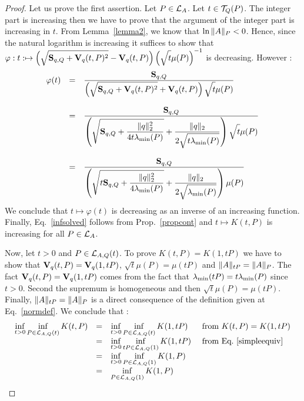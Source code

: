\documentclass[10pt]{article}
\begin{document}
\begin{proof}
Let us prove the first assertion.
Let $P\in\mathcal{L}_{A}$. Let $t\in\mathcal{T}_{Q}(P)$. The integer part is increasing then we have to prove that the argument of the integer part is increasing in $t$. From Lemma~\ref{lemma2}, we know that $\ln{\| A\|_P}<0$. Hence, since the natural logarithm is increasing it suffices to show that $\varphi:t:\mapsto \left(\sqrt{\strut \mathbf{S}_{q,Q}+\mathbf{V}_{q}(t,P)^2}-\mathbf{V}_{q}(t,P)\right)\left(\sqrt{\strut t}\mu(P)\right)^{-1}$ is decreasing. However :
\[
\begin{array}{lll}
\varphi(t)&=&\dfrac{\mathbf{S}_{q,Q}}{\left(\sqrt{\strut \mathbf{S}_{q,Q}+\mathbf{V}_{q}(t,P)^2}+\mathbf{V}_{q}(t,P)\right)\sqrt{\strut t}\mu(P)}\\
\\
&=&\dfrac{\mathbf{S}_{q,Q}}{\left(\sqrt{\strut \mathbf{S}_{q,Q}+\dfrac{\| q\|_2^2 }{4t\lambda_{\operatorname{min}}(P)}}+\dfrac{\| q\|_2 }{2\sqrt{\strut t\lambda_{\operatorname{min}}(P)}}\right)\sqrt{\strut t}\mu(P)}\\
\\
&=&\dfrac{\mathbf{S}_{q,Q}}{\left(\sqrt{\strut t\mathbf{S}_{q,Q}+\dfrac{\| q\|_2^2 }{4\lambda_{\operatorname{min}}(P)}}+\dfrac{\| q\|_2 }{2\sqrt{\strut \lambda_{\operatorname{min}}(P)}}\right)\mu(P)}
\end{array}
\]
We conclude that $t\mapsto \varphi(t)$ is decreasing as an inverse of an increasing function. 
Finally, Eq.~\eqref{infsolved} follows from Prop.~\ref{propcont} and $t\mapsto K(t,P)$ is increasing for all $P\in\mathcal{L}_{A}$.  

Now, let $t>0$ and $P\in\mathcal{L}_{A,Q}(t)$. To prove $K(t,P)=K(1,tP)$ we have to show that $\mathbf{V}_{q}(t,P)=\mathbf{V}_{q}(1,tP)$, $\sqrt{t}\mu(P)=\mu(tP)$
and $\| A\|_{tP}=\| A\|_P$. The fact $\mathbf{V}_{q}(t,P)=\mathbf{V}_{q}(1,tP)$ comes from the fact that $\lambda_{\operatorname{min}}(tP)=t\lambda_{\operatorname{min}}(P)$ since $t>0$. Second the supremum is homogeneous and then $\sqrt{t}\mu(P)=\mu(tP)$. Finally, $\| A\|_{tP}=\| A\|_P$ is a direct consequence of the definition given at Eq.~\eqref{normdef}. We conclude that :
\[
\begin{array}{llll}
\displaystyle{\inf_{t>0} \inf_{P\in\mathcal{L}_{A,Q}(t)} K(t,P)}&=&\displaystyle{\inf_{t>0} \inf_{P\in\mathcal{L}_{A,Q}(t)} K(1,tP)}& \text{ from } K(t,P)=K(1,tP)\\
&=&\displaystyle{\inf_{t>0} \inf_{tP\in\mathcal{L}_{A,Q}(1)} K(1,tP)}&\text{ from Eq.~\eqref{simpleequiv}} \\ 
&=&\displaystyle{\inf_{t>0} \inf_{P\in\mathcal{L}_{A,Q}(1)} K(1,P)}&\\
&=&\displaystyle{\inf_{P\in\mathcal{L}_{A,Q}(1)} K(1,P)}&
\end{array}
\]
\end{proof}

\end{document}
